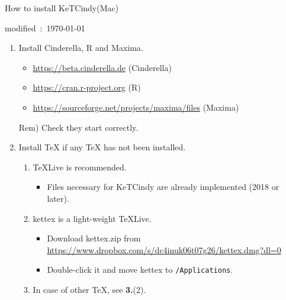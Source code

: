 \documentclass{article}
\begin{document}
\begin{center}
How to install KeTCindy(Mac)
\end{center}

\hfill modified\ :\ \today

\begin{enumerate}[\bf\large 1.]

\item Install Cinderella, R and Maxima.
 \begin{itemize}
 \item \url{https://beta.cinderella.de}  (Cinderella)
 \item \url{https://cran.r-project.org}   (R)
 \item \url{https://sourceforge.net/projects/maxima/files}  (Maxima)
 \end{itemize}
\hspace*{5mm}Rem) Check they start correctly.

\item Install TeX if any TeX has not been installed.
  \begin{enumerate}[(1)]
  \item TeXLive is recommended.
    \begin{itemize}
    \item Files necessary for KeTCindy are already implemented (2018 or later).
    \end{itemize}
  \item kettex is a light-weight TeXLive.
    \begin{itemize}
    \item Download kettex.zip from\\
    \hspace*{10mm}\url{https://www.dropbox.com/s/dc4inuk06t07g26/kettex.dmg?dl=0}
    \item Double-click it and move kettex to \verb|/Applications|.
    \end{itemize}
  \item In case of other TeX, see {\bf 3.}(2).
 \end{enumerate}



\end{enumerate}
\end{document}
